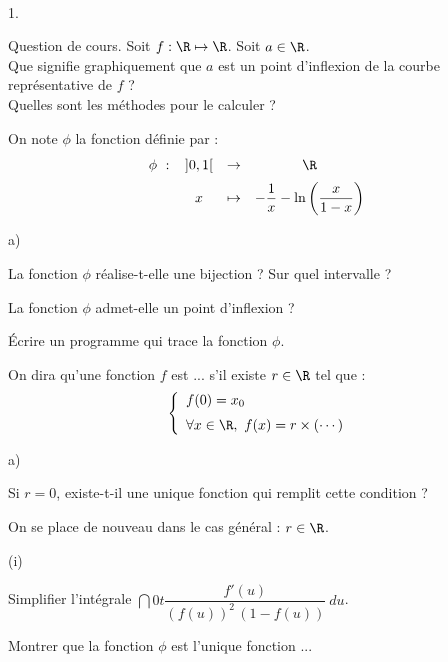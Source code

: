 \documentclass[11pt]{article}%
\begin{document}
\begin{exerciceAP}~
 \begin{noliste}{1.}
  \item Question de cours. Soit $f: \R \mapsto \R$. Soit $a \in \R$.\\
  Que signifie graphiquement que $a$ est un point d'inflexion de la 
  courbe représentative de $f$ ?\\
  Quelles sont les méthodes pour le calculer ?
  
  \item On note $\phi$ la fonction définie par :
  \[
   \phi \ : \ 
   \begin{array}[t]{ccc}
    ]0,1[ & \to & \R
    \\[.2cm]
    x & \mapsto & - \dfrac{1}{x} - \ln
    \left(\dfrac{x}{1-x}\right)
   \end{array}
  \]
  \begin{noliste}{a)}
    \item La fonction $\phi$ réalise-t-elle une bijection ? Sur quel 
    intervalle ?
    
    \item La fonction $\phi$ admet-elle un point d'inflexion ?
    
    \item Écrire un programme \Scilab{} qui trace la fonction $\phi$.
  \end{noliste}
  
  \item On dira qu'une fonction $f$ est \og ... \fg{} s'il existe $r 
  \in \R$ tel que :
  \[
   \left\{
   \begin{array}{l}
    f(0) = x_0\\[.2cm]
    \forall x \in \R, \ f(x) = r \times 
    (\cdots)
   \end{array}
   \right.
  \]
  \begin{noliste}{a)}
    \item Si $r=0$, existe-t-il une unique fonction qui remplit cette 
    condition ?
    
    \item On se place de nouveau dans le cas général : $r\in \R$.
    \begin{nonoliste}{(i)}
     \item Simplifier l'intégrale $\dint{0}{t} \dfrac{f'(u)}{(f(u))^2 
     \, (1-f(u))} \ du$.
     
     \item Montrer que la fonction $\phi$ est l'unique fonction ...
    \end{nonoliste}
  \end{noliste}
 \end{noliste}
\end{exerciceAP}
\end{document}
